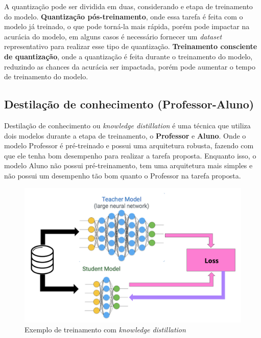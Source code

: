 A quantização pode ser dividida em duas, considerando e etapa de treinamento do modelo.
\textbf{Quantização pós-treinamento}, onde essa tarefa é feita com o modelo já treinado, o que pode torná-la mais rápida,
porém pode impactar na acurácia do modelo, em alguns casos é necessário fornecer um \textit{dataset} representativo
para realizar esse tipo de quantização.
\textbf{Treinamento consciente de quantização}, onde a quantização é feita durante o treinamento do modelo, reduzindo as
chances da acurácia ser impactada, porém pode aumentar o tempo de treinamento do modelo.

\subsection{Destilação de conhecimento (Professor-Aluno)}\label{conceitos_destilacao}

Destilação de conhecimento ou \textit{knowledge distillation} \cite{hinton2015distilling} é uma técnica que utiliza dois
modelos durante a etapa de treinamento, o \textbf{Professor} e \textbf{Aluno}.
Onde o modelo Professor é pré-treinado e possui uma arquitetura robusta, fazendo com que ele tenha bom desempenho para
realizar a tarefa proposta.
Enquanto isso, o modelo Aluno não possui pré-treinamento, tem uma arquitetura mais simples e não possui um desempenho
tão bom quanto o Professor na tarefa proposta.

\begin{figure}[htb]
	\begin{center}
		\includegraphics[scale=0.5]{Imagens/kd_exemplo}
	\end{center}
	\caption {\label{cap_conceitos_exemplo_kd}Exemplo de treinamento com \textit{knowledge distillation}}
\end{figure}

